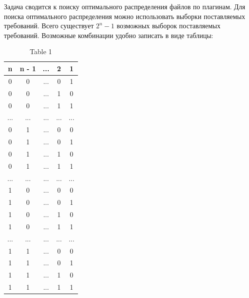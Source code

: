 \documentclass{article}
\begin{document}
  Задача сводится к поиску оптимального распределения файлов по плагинам. Для поиска оптимального распределения можно использовать выборки поставляемых требований. Всего существует $2^n - 1$ возможных выборок поставляемых требований. Возможные комбинации удобно записать в виде таблицы:
  \begin{table}[H]
    \caption{Table 1}
    \begin{center}
      \begin{tabular}[H]{|c|c|c|c|c|}
         n  & n - 1 & ... &  2  &  1  \\
         \hline
         0  &   0   & ... &  0  &  1  \\
         0  &   0   & ... &  1  &  0  \\
         0  &   0   & ... &  1  &  1  \\
        ... &  ...  & ... & ... & ... \\
         0  &   1   & ... &  0  &  0  \\
         0  &   1   & ... &  0  &  1  \\
         0  &   1   & ... &  1  &  0  \\
         0  &   1   & ... &  1  &  1  \\
        ... &  ...  & ... & ... & ... \\
         1  &   0   & ... &  0  &  0  \\
         1  &   0   & ... &  0  &  1  \\
         1  &   0   & ... &  1  &  0  \\
         1  &   0   & ... &  1  &  1  \\
        ... &  ...  & ... & ... & ... \\
         1  &   1   & ... &  0  &  0  \\
         1  &   1   & ... &  0  &  1  \\
         1  &   1   & ... &  1  &  0  \\
         1  &   1   & ... &  1  &  1  \\
      \end{tabular}
    \end{center}
  \end{table}
\end{document}
